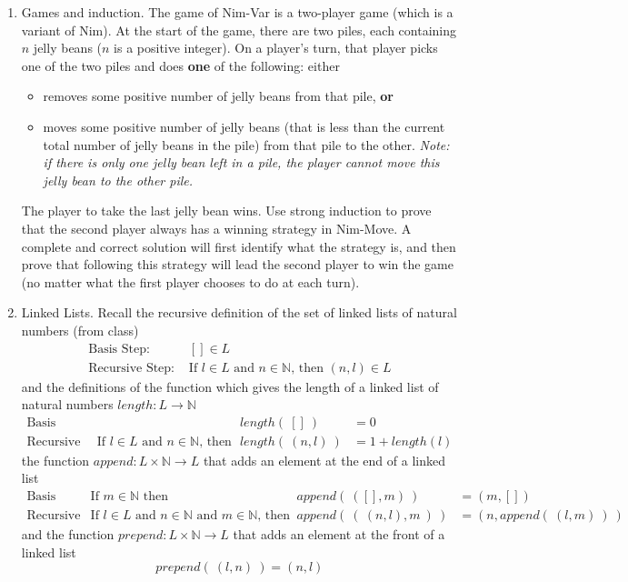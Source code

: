\begin{enumerate}[labelindent=0pt, leftmargin=0pt]
    \item \gradeCorrect Games and induction.  The game of Nim-Var is a two-player game (which is a variant of Nim).
    At the start of the game, there are two piles, each containing $n$ 
    jelly beans
    ($n$ is a positive integer).  On a player's turn, that player picks one 
    of the two piles and does {\bf one} of the following: either
    \begin{itemize}
    \item removes some positive number of jelly beans from that pile, {\bf or}
    \item moves some positive number of jelly beans (that is less than the
    current total number of jelly beans in the pile) from that pile to the other.  
    {\it Note: if there is only one jelly bean left in a pile, the player cannot move
    this jelly bean to the other pile.}
    \end{itemize}
    The player to take the last jelly bean wins.  
    Use strong induction to prove that the second player always has a winning strategy in Nim-Move.
    A complete and correct solution will first identify what the strategy is, and then prove that 
    following this strategy will lead the second player to win the game (no matter what the first 
    player chooses to do at each turn).
    
    
    
    \item Linked Lists. Recall the recursive definition of the set of linked lists of 
    natural numbers (from class)
    \[
    \begin{array}{ll}
        \textrm{Basis Step: } & [] \in L \\
        \textrm{Recursive Step: } & \textrm{If } l \in L\textrm{ and }n \in \mathbb{N} \textrm{, then } (n, l) \in L
    \end{array}
    \]
    and the definitions of the function which gives the length of a linked list of natural numbers 
    $length: L \to \mathbb{N}$
        \[
        \begin{array}{llll}
            \textrm{Basis Step:} &  & length(~[]~) &= 0 \\
            \textrm{Recursive Step:} & \textrm{If } l \in L\textrm{ and }n \in \mathbb{N}\textrm{, then  } & length(~(n, l)~)  &= 1+ length(l)
        \end{array}
    \]
    the function $append : L \times \mathbb{N} \to L$ that 
    adds an element at the end of a linked list
    \[
        \begin{array}{llll}
        \textrm{Basis Step:} & \textrm{If } m \in \mathbb{N}\textrm{ then } & append(~([], m)~) & = (m, [])\\
        \textrm{Recursive Step:} & \textrm{If } l \in L\textrm{ and }n \in \mathbb{N}\textrm{ and }m \in \mathbb{N}\textrm{, then  } & append(~(~(n, l), m~)~)  &= (n, append(~(l, m)~)~)
        \end{array}
    \]
    and the function $prepend : L \times \mathbb{N} \to L$ that adds an element at the 
    front of a linked list 
    \[
    prepend(~(l, n)~) = (n, l)
    \]


\end{enumerate}
